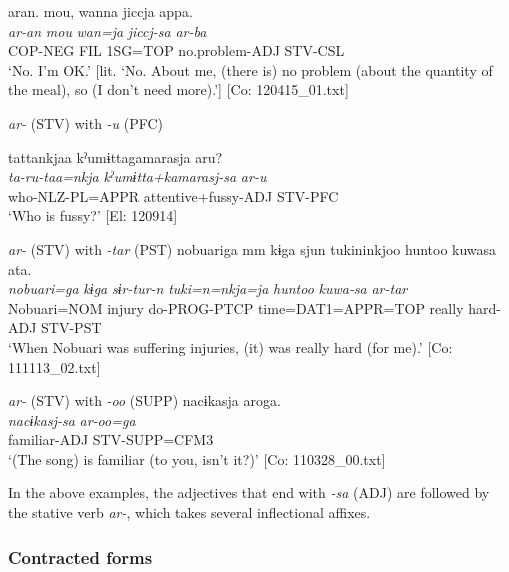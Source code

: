 \ex \label{ex:9.45d} %
 \glll  aran.  {\textbar}mou{\textbar},  wanna  jiccja  appa.\\
      \textit{ar-an}  \textit{mou}  \textit{wan=ja}  \textit{jiccj-sa}  \textit{ar-ba}\\
      COP-NEG  FIL  1SG=TOP  no.problem-ADJ  STV-CSL\\
      \glt       ‘No. I’m OK.’ [lit. ‘No. About me, (there is) no problem (about the quantity of the meal), so (I don’t need more).’] [Co: 120415\_01.txt]

\exi{} \textit{ar-} (STV) with \textit{{}-u} (PFC)

\ex \label{ex:9.45e} %
 \glll  tattankjaa  kˀumɨttagamarasja  aru?\\
      \textit{ta-ru-taa=nkja}  \textit{kˀumɨtta+kamarasj-sa}  \textit{ar-u}\\
      who-NLZ-PL=APPR  attentive+fussy-ADJ  STV-PFC\\
      \glt       ‘Who is fussy?’ [El: 120914]

\exi{}  \textit{ar-} (STV) with \textit{{}-tar} (PST)
\ex
\glll   nobuariga  mm  kɨga  sjun  tukininkjoo  huntoo  kuwasa  ata.\\
      \textit{nobuari=ga}    \textit{kɨga}  \textit{sɨr-tur-n}  \textit{tuki=n=nkja=ja}  \textit{huntoo}  \textit{kuwa-sa}  \textit{ar-tar}\\
      Nobuari=NOM    injury  do-PROG-PTCP  time=DAT1=APPR=TOP  really  hard-ADJ  STV-PST\\
      \glt       ‘When Nobuari was suffering injuries, (it) was really hard (for me).’ [Co: 111113\_02.txt]

\exi{}  \textit{ar-} (STV) with \textit{{}-oo} (SUPP)
\ex
\glll     nacɨkasja  aroga.\footnotemark\\
      \textit{nacɨkasj-sa}  \textit{ar-oo=ga}\\
      familiar-ADJ  STV-SUPP=CFM3\\
      \glt       ‘(The song) is familiar (to you, isn’t it?)’ [Co: 110328\_00.txt]
    \z
\z{}

In the above examples, the adjectives that end with \textit{{}-sa} (ADJ) are followed by the stative verb \textit{ar-}, which takes several inflectional affixes.

\subsubsection{Contracted forms}\label{sec:9.2.2.2}

